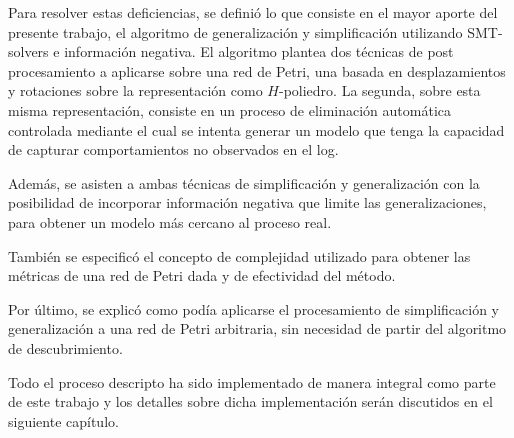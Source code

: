 Para resolver estas deficiencias, se definió lo que consiste en el mayor aporte del presente trabajo, el  algoritmo de
generalización y simplificación utilizando SMT-solvers e información negativa.
El algoritmo plantea dos técnicas de post procesamiento a aplicarse sobre una red de Petri, una basada en 
desplazamientos y rotaciones sobre la representación como $H$-poliedro. La segunda, sobre esta misma representación,
consiste en un proceso de eliminación automática controlada mediante el cual se intenta 
generar un modelo que tenga la capacidad de capturar comportamientos no observados en el log.

Además, se asisten a ambas técnicas de simplificación y generalización con la posibilidad de incorporar
información negativa que limite las generalizaciones, para obtener un modelo más cercano al proceso real.

También se especificó el concepto de complejidad utilizado para obtener las métricas de una red de
Petri dada y de efectividad del método.

Por último, se explicó como podía aplicarse el procesamiento de simplificación y generalización a una red de 
Petri arbitraria, sin necesidad de partir del algoritmo de descubrimiento.

Todo el proceso descripto ha sido implementado de manera integral como parte de este trabajo
y los detalles sobre dicha implementación serán discutidos en el siguiente capítulo.
